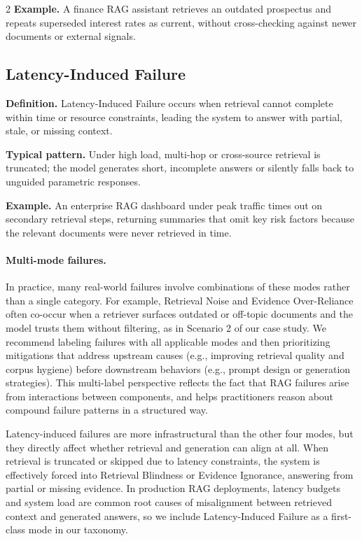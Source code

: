 \documentclass[11pt,a4paper]{article}
\begin{document}
\begin{multicols}{2}
\textbf{Example.} A finance RAG assistant retrieves an outdated prospectus and repeats superseded interest rates as current, without cross-checking against newer documents or external signals.

\subsection{Latency-Induced Failure}

\textbf{Definition.} Latency-Induced Failure occurs when retrieval cannot complete within time or resource constraints, leading the system to answer with partial, stale, or missing context.

\textbf{Typical pattern.} Under high load, multi-hop or cross-source retrieval is truncated; the model generates short, incomplete answers or silently falls back to unguided parametric responses.

\textbf{Example.} An enterprise RAG dashboard under peak traffic times out on secondary retrieval steps, returning summaries that omit key risk factors because the relevant documents were never retrieved in time.

\paragraph{Multi-mode failures.}
In practice, many real-world failures involve combinations of these modes rather than a single category. For example, Retrieval Noise and Evidence Over-Reliance often co-occur when a retriever surfaces outdated or off-topic documents and the model trusts them without filtering, as in Scenario 2 of our case study. We recommend labeling failures with all applicable modes and then prioritizing mitigations that address upstream causes (e.g., improving retrieval quality and corpus hygiene) before downstream behaviors (e.g., prompt design or generation strategies). This multi-label perspective reflects the fact that RAG failures arise from interactions between components, and helps practitioners reason about compound failure patterns in a structured way.

Latency-induced failures are more infrastructural than the other four modes, but they directly affect whether retrieval and generation can align at all. When retrieval is truncated or skipped due to latency constraints, the system is effectively forced into Retrieval Blindness or Evidence Ignorance, answering from partial or missing evidence. In production RAG deployments, latency budgets and system load are common root causes of misalignment between retrieved context and generated answers, so we include Latency-Induced Failure as a first-class mode in our taxonomy.


\end{multicols}
\end{document}
